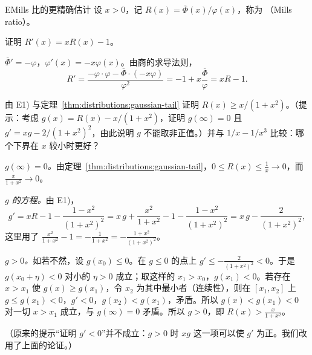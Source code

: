 \begin{probleme}[问题]{E}{Mills 比的更精确估计}
设 $x>0$，记 $R(x)=\overline\Phi(x)/\varphi(x)$，称为 （Mills ratio）。
\begin{questions}
\item 证明 $R'(x)=xR(x)-1$。
\begin{solution}
$\overline\Phi'=-\varphi$，$\varphi'(x)=-x\varphi(x)$。由商的求导法则，
\[
R'=\frac{-\varphi\cdot\varphi-\overline\Phi\cdot(-x\varphi)}{\varphi^2}=-1+x\frac{\overline\Phi}\varphi=xR-1 .
\]
\end{solution}
\item 由 E1) 与定理~\ref{thm:distributions:gaussian-tail} 证明 $R(x)\geqslant x/(1+x^2)$。（提示：考虑 $g(x)=R(x)-x/(1+x^2)$，证明 $g(\infty)=0$ 且 $g'=xg-2/(1+x^2)^2$，由此说明 $g$ 不能取非正值。）并与 $1/x-1/x^3$ 比较：哪个下界在 $x$ 较小时更好？
\begin{solution}
\emph{$g(\infty)=0$。}由定理~\ref{thm:distributions:gaussian-tail}，$0\leqslant R(x)\leqslant\frac1x\to0$，而 $\frac x{1+x^2}\to0$。

\emph{$g$ 的方程。}由 E1)，
\[
g'=xR-1-\frac{1-x^2}{(1+x^2)^2}=x\,g+\frac{x^2}{1+x^2}-1-\frac{1-x^2}{(1+x^2)^2}=x\,g-\frac{2}{(1+x^2)^2},
\]
这里用了 $\frac{x^2}{1+x^2}-1=-\frac1{1+x^2}=-\frac{1+x^2}{(1+x^2)^2}$。

\emph{$g>0$。}如若不然，设 $g(x_0)\leqslant0$。在 $g\leqslant0$ 的点上 $g'\leqslant-\frac2{(1+x^2)^2}<0$。于是 $g(x_0+\eta)<0$ 对小的 $\eta>0$ 成立；取这样的 $x_1>x_0$，$g(x_1)<0$。若存在 $x>x_1$ 使 $g(x)\geqslant g(x_1)$，令 $x_2$ 为其中最小者（连续性），则在 $[x_1,x_2]$ 上 $g\leqslant g(x_1)<0$，$g'<0$，$g(x_2)<g(x_1)$，矛盾。所以 $g(x)<g(x_1)<0$ 对一切 $x>x_1$ 成立，与 $g(\infty)=0$ 矛盾。所以 $g>0$，即 $R(x)>\frac x{1+x^2}$。

（原来的提示“证明 $g'<0$”并不成立：$g>0$ 时 $xg$ 这一项可以使 $g'$ 为正。我们改用了上面的论证。）


\end{solution}
\end{questions}
\end{probleme}
